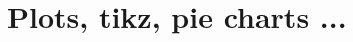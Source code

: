 \documentclass[12pt]{article}
\begin{document}
\begin{comment}
\clearpage
\section{Text, Symbols}

 
\clearpage
\section{Code, listings, minted \dots}


 
\clearpage
\section{Tables, boxes and so on}


\clearpage
\section{Figures}


\clearpage
\section{Numbering, enumeration, itemizing}

\end{comment}

\clearpage
\section{Plots, tikz, pie charts ...}

\begin{comment}
\clearpage
\section{Highlighting}

 
\clearpage
\section{For Fun}


\clearpage
\section{ Animation, videos, interaction}

\end{comment}
\end{document}
